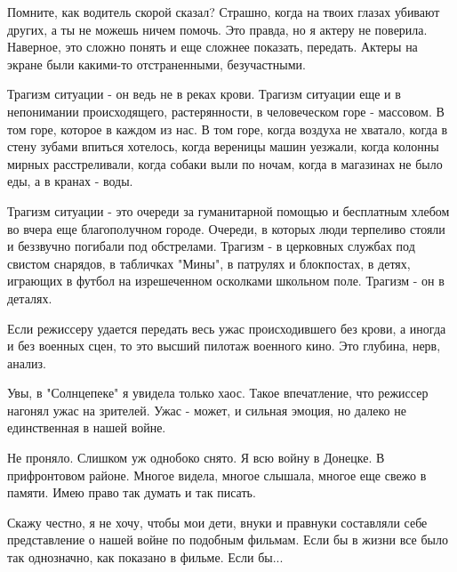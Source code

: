 Помните, как водитель скорой сказал? Страшно, когда на твоих глазах убивают
других, а ты не можешь ничем помочь.  Это правда, но я актеру не поверила.
Наверное, это сложно понять и еще сложнее показать, передать. Актеры на экране
были какими-то отстраненными, безучастными.

Трагизм ситуации - он ведь не в реках крови. Трагизм ситуации еще и в
непонимании происходящего, растерянности, в человеческом горе - массовом. В том
горе, которое в каждом из нас. В том горе, когда воздуха не хватало, когда в
стену зубами впиться хотелось, когда вереницы машин уезжали, когда колонны
мирных расстреливали, когда собаки выли по ночам, когда в магазинах не было
еды, а в кранах - воды. 

Трагизм ситуации - это очереди за гуманитарной помощью и бесплатным хлебом во
вчера еще благополучном городе. Очереди, в которых люди  терпеливо стояли и
беззвучно погибали под обстрелами.  Трагизм - в церковных службах под свистом
снарядов, в табличках "Мины", в патрулях и блокпостах, в детях, играющих в
футбол на изрешеченном осколками школьном поле. Трагизм - он в деталях.  

Если режиссеру удается передать весь ужас происходившего без крови, а иногда и
без военных сцен, то это высший пилотаж военного кино. Это глубина, нерв,
анализ.

Увы, в "Солнцепеке" я увидела только хаос. Такое впечатление, что режиссер
нагонял ужас на зрителей. Ужас - может, и сильная эмоция, но далеко не
единственная в нашей войне.

Не проняло. Слишком уж однобоко снято. Я всю войну в Донецке. В прифронтовом
районе. Многое видела, многое слышала, многое еще свежо в памяти. Имею право
так думать и так писать.

Скажу честно, я не хочу, чтобы мои дети, внуки и правнуки составляли себе
представление о нашей войне по подобным фильмам. Если бы в жизни все было так
однозначно, как показано в фильме. Если бы...

